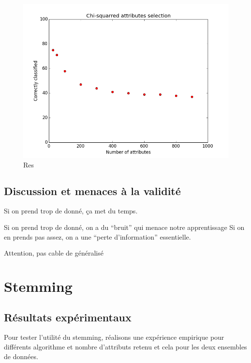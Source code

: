 \documentclass[a4paper,11pt]{article}
\begin{document}
\begin{figure}[H]
	\includegraphics[width=12cm]{images/part2chisq.png} 
	\centering
	\caption{Res}
	\label{fig:comp}
\end{figure}


\subsection{Discussion et menaces à la validité}

Si on prend trop de donné, ça met du temps.

Si on prend trop de donné, on a du “bruit” qui menace notre apprentissage
Si on en prends pas assez, on a une “perte d’information” essentielle.

Attention, pas cable de généralisé

\section{Stemming}


\subsection{Résultats expérimentaux}

Pour tester l'utilité du stemming, réalisons une expérience empirique pour différents algorithme et nombre d'attributs retenu et cela pour les deux ensembles de données.
\end{document}
